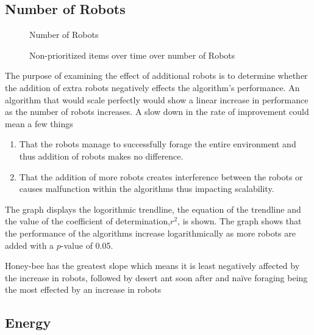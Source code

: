 \subsection{Number of Robots}
\label{results:numberenvironments}


\begin{figure}[!htb]
\centering
\resizebox{\textwidth}{!}{}
\caption{Number of Robots }
\label{robotsgoldplot}
\end{figure}

\begin{figure}[!htb]
\centering
\resizebox{\textwidth}{!}{}
\caption{Non-prioritized items over time over number of Robots}
\label{robotswasteplot}
\end{figure}

The purpose of examining the effect of additional robots is to determine whether the addition of extra robots negatively effects the algorithm's performance. An algorithm that would scale perfectly would show a linear increase in performance as the number of robots increases. A slow down in the rate of improvement could mean a few things 
\begin{enumerate}
\item That the robots manage to successfully forage the entire environment and thus addition of robots makes no difference.
\item That the addition of more robots creates interference between the robots or causes malfunction within the algorithms thus impacting scalability. 
\end{enumerate}


The graph displays the  logorithmic trendline, the equation of the trendline and the value of the coefficient of determination,$r^2$, is shown. The graph shows that the performance of the algorithms increase logarithmically as more robots are added with a $p$-value of 0.05. 

Honey-bee has the greatest slope which means it is least negatively affected by the increase in robots, followed by desert ant soon after and na\"ive foraging being the most effected by an increase in robots


\subsection{Energy}
\label{results:energy}


